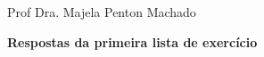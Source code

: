 
\usepackage{fullpage}      %
\usepackage{indentfirst}   %



\noindent Prof Dra. Majela Penton Machado
\\

\noindent \centerline{\textbf{Respostas da primeira lista de exercício}}
\\









